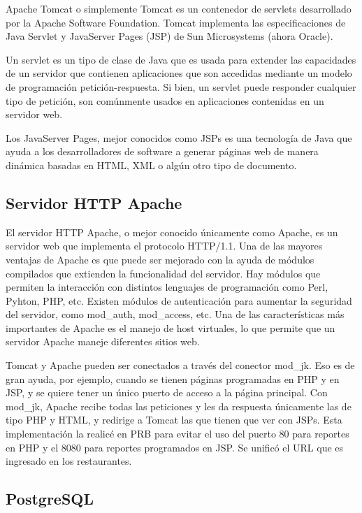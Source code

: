 Apache Tomcat o simplemente Tomcat es un contenedor de servlets desarrollado por la Apache Software Foundation. Tomcat implementa las especificaciones de Java Servlet y JavaServer Pages (JSP) de Sun Microsystems (ahora Oracle).

Un servlet es un tipo de clase de Java que es usada para extender las capacidades de un servidor que contienen aplicaciones que son accedidas mediante un modelo de programación petición-respuesta. Si bien, un servlet puede responder cualquier tipo de petición, son comúnmente usados en aplicaciones contenidas en un servidor web.

Los JavaServer Pages, mejor conocidos como JSPs es una tecnología de Java que ayuda a los desarrolladores de software a generar páginas web de manera dinámica basadas en HTML, XML o algún otro tipo de documento.

\subsection{Servidor HTTP Apache}
\label{sec:apache}

El servidor HTTP Apache, o mejor conocido únicamente como Apache, es un servidor web que implementa el protocolo HTTP/1.1. Una de las mayores ventajas de Apache es que puede ser mejorado con la ayuda de módulos compilados que extienden la funcionalidad del servidor. Hay módulos que permiten la interacción con distintos lenguajes de programación como Perl, Pyhton, PHP, etc. Existen módulos de autenticación para aumentar la seguridad del servidor, como mod\_auth, mod\_access, etc. Una de las características más importantes de Apache es el manejo de host virtuales, lo que permite que un servidor Apache maneje diferentes sitios web.

Tomcat y Apache pueden ser conectados a través del conector mod\_jk. Eso es de gran ayuda, por ejemplo, cuando se tienen páginas programadas en PHP y en JSP, y se quiere tener un único puerto de acceso a la página principal. Con mod\_jk, Apache recibe todas las peticiones y les da respuesta únicamente las de tipo PHP y HTML, y redirige a Tomcat las que tienen que ver con JSPs. Esta implementación la realicé en PRB para evitar el uso del puerto 80 para reportes en PHP y el 8080 para reportes programados en JSP. Se unificó el URL que es ingresado en los restaurantes.

\subsection{PostgreSQL}
\label{sec:postgresql}

